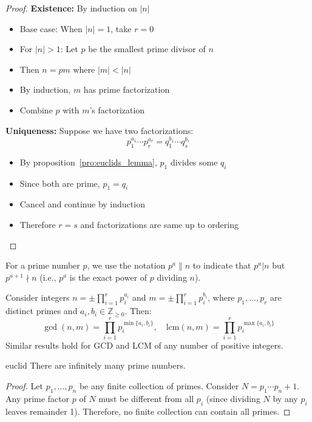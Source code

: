 \begin{proof}
  \textbf{Existence:} By induction on $|n|$
  \begin{itemize}
    \item Base case: When $|n|=1$, take $r=0$
    \item For $|n|>1$: Let $p$ be the smallest prime divisor of $n$
    \item Then $n = pm$ where $|m| < |n|$
    \item By induction, $m$ has prime factorization
    \item Combine $p$ with $m$'s factorization
  \end{itemize}

  \textbf{Uniqueness:} Suppose we have two factorizations:
  \[
    p_1^{a_1}\cdots p_r^{a_r} = q_1^{b_1}\cdots q_s^{b_s}
  \]
  \begin{itemize}
    \item By proposition~\ref{pro:euclids_lemma}, $p_1$ divides some $q_i$
    \item Since both are prime, $p_1 = q_i$
    \item Cancel and continue by induction
    \item Therefore $r=s$ and factorizations are same up to ordering
  \end{itemize}
\end{proof}

\begin{remark}
  For a prime number $p$, we use the notation $p^a \parallel n$ to indicate that $p^a|n$ but $p^{a+1} \nmid n$ (i.e., $p^a$ is the exact power of $p$ dividing $n$).
\end{remark}

\begin{corollary}
  Consider integers $n = \pm \prod_{i=1}^r p_i^{a_i}$ and $m = \pm \prod_{i=1}^r p_i^{b_i}$, where $p_1,\ldots,p_r$ are distinct primes and $a_i,b_i \in \mathbb{Z}_{\geq 0}$. Then:
  \[
    \gcd(n,m) = \prod_{i=1}^r p_i^{\min\{a_i,b_i\}}, \quad \text{lcm}(n,m) = \prod_{i=1}^r p_i^{\max\{a_i,b_i\}}
  \]
  Similar results hold for GCD and LCM of any number of positive integers.
\end{corollary}

\begin{theorem}[Euclid]{euclid}
  There are infinitely many prime numbers.
\end{theorem}

\begin{proof}
  Let $p_1,\ldots,p_n$ be any finite collection of primes.
  Consider $N = p_1\cdots p_n + 1$.
  Any prime factor $p$ of $N$ must be different from all $p_i$ (since dividing $N$ by any $p_i$ leaves remainder 1).
  Therefore, no finite collection can contain all primes.
\end{proof}

